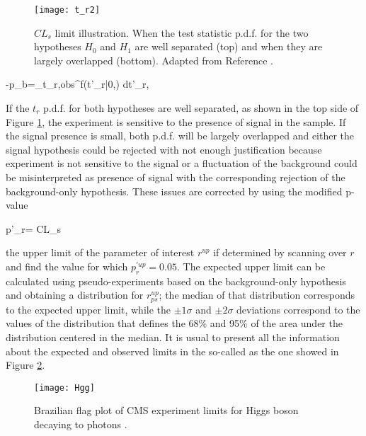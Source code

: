 \begin{figure}[!h]
  \centering
  \texttt{[image: t\_r2]}
  \caption[Illustration of the $CL_s$ limit.]{ $CL_s$ limit illustration. When the test statistic p.d.f. for the two hypotheses $H_0$ and $ H_1$ are well separated (top) and when they are largely overlapped (bottom). Adapted from Reference \cite{luca}.}\label{fig:t_r2}
\end{figure}

-p_b=\int_{t_{r,obs}}^\infty f(t'_r|0,\bm{\theta}) dt'_r,
\eeqn

If the $t_r$ p.d.f. for both hypotheses are well separated, as shown in the top side of Figure \ref{fig:t_r2}, the experiment is sensitive to the presence of signal in the sample. If the signal presence is small, both p.d.f. will be largely overlapped and either the signal hypothesis could be rejected with not enough justification because experiment is not sensitive to the signal or a fluctuation of the background could be misinterpreted as presence of signal with the corresponding rejection of the background-only hypothesis. These issues are corrected by using the modified p-value \cite{read}

\beqn
p'_r=  \equiv CL_s
\eeqn

the upper limit of the parameter of interest $r^{up}$ if determined by scanning over $r$ and find the value for which $p_r^{'up}=0.05$. The expected upper limit can be calculated using pseudo-experiments based on the background-only hypothesis and obtaining a distribution for $r^{up}_{ps}$; the median of that distribution corresponds to the expected upper limit, while the $\pm 1\sigma$ and $\pm2\sigma$ deviations correspond to the values of the distribution that defines the 68\% and 95\% of the area under the distribution centered in the median. It is usual to present all the information about the expected and observed limits in the so-called  as the one showed in Figure \ref{fig:hgg}.

\begin{figure}[!h]
  \centering
  \texttt{[image: Hgg]}
  \caption[Example of Brazilian flag plot]{ Brazilian flag plot of CMS experiment limits for Higgs boson decaying to photons \cite{hgg}.}\label{fig:hgg}
\end{figure}




